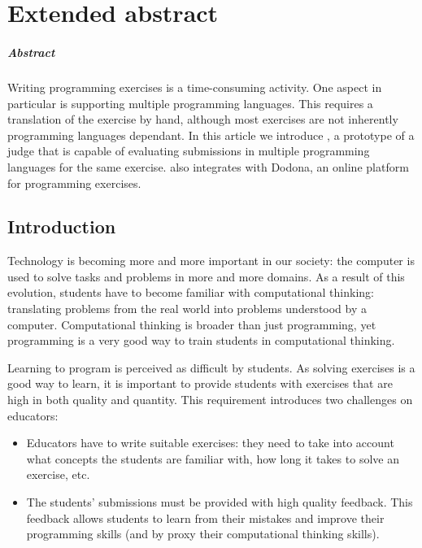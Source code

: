 \chapter*{Extended abstract}
\begin{multicols}{2}


    \paragraph*{Abstract}

    Writing programming exercises is a time-consuming activity.
    One aspect in particular is supporting multiple programming languages.
    This requires a translation of the exercise by hand, although most exercises are not inherently programming languages dependant.
    In this article we introduce \tested{}, a prototype of a judge that is capable of evaluating submissions in multiple programming languages for the same exercise.
    \tested{} also integrates with Dodona, an online platform for programming exercises.


    \section{Introduction}\label{sec:extended-introduction}

    Technology is becoming more and more important in our society: the computer is used to solve tasks and problems in more and more domains.
    As a result of this evolution, students have to become familiar with computational thinking: translating problems from the real world into problems understood by a computer.
    Computational thinking is broader than just programming, yet programming is a very good way to train students in computational thinking.

    Learning to program is perceived as difficult by students.
    As solving exercises is a good way to learn, it is important to provide students with exercises that are high in both quality and quantity.
    This requirement introduces two challenges on educators:
    
    \begin{itemize}
        \item Educators have to write suitable exercises: they need to take into account what concepts the students are familiar with, how long it takes to solve an exercise, etc.
        \item The students' submissions must be provided with high quality feedback.
        This feedback allows students to learn from their mistakes and improve their programming skills (and by proxy their computational thinking skills).
    \end{itemize}
    

\end{multicols}
